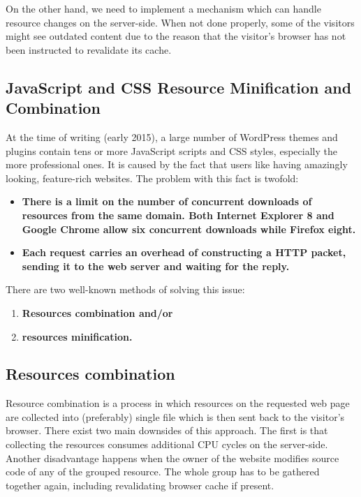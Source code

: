 On the other hand, we need to implement a mechanism which can handle resource changes on the server-side. When not done properly, some of the visitors might see outdated content due to the reason that the visitor’s browser has not been instructed to revalidate its cache.

\subsection{JavaScript and CSS Resource Minification and Combination}

At the time of writing (early 2015), a large number of WordPress themes and plugins contain tens or more JavaScript scripts and CSS styles, especially the more professional ones. It is caused by the fact that users like having amazingly looking, feature-rich websites. The problem with this fact is twofold:
 
\begin{itemize}
	\item \textbf{There is a limit on the number of concurrent downloads of resources from the same domain. Both Internet Explorer 8 and Google Chrome allow six concurrent downloads while Firefox eight. \cite{SO:Browser-concurrent-downloads}}
	\item \textbf{Each request carries an overhead of constructing a HTTP packet, sending it to the web server and waiting for the reply.}
\end{itemize}

There are two well-known methods of solving this issue:

\begin{enumerate}
    \item\textbf{Resources combination and/or}
    \item\textbf{resources minification.}
  \end{enumerate}

\subsection*{Resources combination}

Resource combination is a process in which resources on the requested web page are collected into (preferably) single file which is then sent back to the visitor’s browser. There exist two main downsides of this approach. The first is that collecting the resources consumes additional CPU cycles on the server-side. Another disadvantage happens when the owner of the website modifies source code of any of the grouped resource. The whole group has to be gathered together again, including revalidating browser cache if present.

